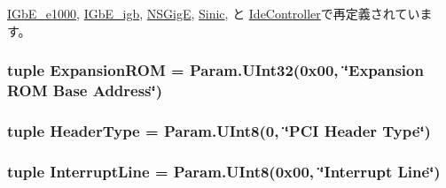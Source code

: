 \hyperlink{classEthernet_1_1IGbE__e1000_a4a8ed9a0233fc6d0ce178569c4de25d0}{IGbE\_\-e1000}, \hyperlink{classEthernet_1_1IGbE__igb_a4a8ed9a0233fc6d0ce178569c4de25d0}{IGbE\_\-igb}, \hyperlink{classEthernet_1_1NSGigE_a4a8ed9a0233fc6d0ce178569c4de25d0}{NSGigE}, \hyperlink{classEthernet_1_1Sinic_a4a8ed9a0233fc6d0ce178569c4de25d0}{Sinic}, と \hyperlink{classIde_1_1IdeController_a4a8ed9a0233fc6d0ce178569c4de25d0}{IdeController}で再定義されています。\hypertarget{classPci_1_1PciDevice_a6fae934678e80bb655627c43e85de188}{
\subsubsection[{ExpansionROM}]{\setlength{\rightskip}{0pt plus 5cm}tuple {\bf ExpansionROM} = Param.UInt32(0x00, \char`\"{}Expansion ROM Base Address\char`\"{})}}
\label{classPci_1_1PciDevice_a6fae934678e80bb655627c43e85de188}
\hypertarget{classPci_1_1PciDevice_a1124c5123a382ae26313212b03453e0f}{
\subsubsection[{HeaderType}]{\setlength{\rightskip}{0pt plus 5cm}tuple {\bf HeaderType} = Param.UInt8(0, \char`\"{}PCI Header Type\char`\"{})}}
\label{classPci_1_1PciDevice_a1124c5123a382ae26313212b03453e0f}
\hypertarget{classPci_1_1PciDevice_abfcd311da14374993f51eece70622ee4}{
\subsubsection[{InterruptLine}]{\setlength{\rightskip}{0pt plus 5cm}tuple {\bf InterruptLine} = Param.UInt8(0x00, \char`\"{}Interrupt Line\char`\"{})}}
\label{classPci_1_1PciDevice_abfcd311da14374993f51eece70622ee4}


